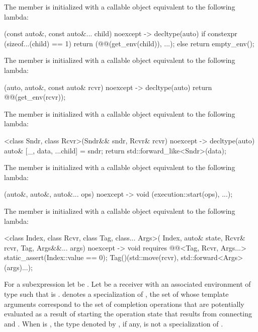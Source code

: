 \pnum
The member 
is initialized with a callable object equivalent to the following lambda:
\begin{codeblock}
[](const auto&, const auto&... child) noexcept -> decltype(auto) {
  if constexpr (sizeof...(child) == 1)
    return (@@(get_env(child)), ...);
  else
    return empty_env();
}
\end{codeblock}

\pnum
The member 
is initialized with a callable object equivalent to the following lambda:
\begin{codeblock}
[](auto, auto&, const auto& rcvr) noexcept -> decltype(auto) {
  return @@(get_env(rcvr));
}
\end{codeblock}

\pnum
The member 
is initialized with a callable object equivalent to the following lambda:
\begin{codeblock}
[]<class Sndr, class Rcvr>(Sndr&& sndr, Rcvr& rcvr) noexcept -> decltype(auto) {
  auto& [_, data, ...child] = sndr;
  return std::forward_like<Sndr>(data);
}
\end{codeblock}

\pnum
The member 
is initialized with a callable object equivalent to the following lambda:
\begin{codeblock}
[](auto&, auto&, auto&... ops) noexcept -> void {
  (execution::start(ops), ...);
}
\end{codeblock}

\pnum
The member 
is initialized with a callable object equivalent to the following lambda:
\begin{codeblock}
[]<class Index, class Rcvr, class Tag, class... Args>(
  Index, auto& state, Rcvr& rcvr, Tag, Args&&... args) noexcept
    -> void requires @@<Tag, Rcvr, Args...> {
  static_assert(Index::value == 0);
  Tag()(std::move(rcvr), std::forward<Args>(args)...);
}
\end{codeblock}

\pnum
For a subexpression  let  be .
Let  be a receiver
with an associated environment of type 
such that  is .
 denotes
a specialization of ,
the set of whose template arguments correspond to
the set of completion operations that are potentially evaluated
as a result of starting
the operation state that results from connecting  and .
When  is ,
the type denoted by ,
if any, is not a specialization of .

